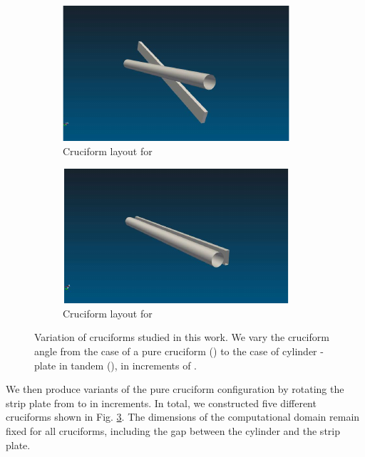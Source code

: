 \documentclass[oneside]{utmthesis}
\begin{document}
\begin{figure}
  \raggedright
  \begin{subfigure}[h]{0.3\textwidth}
    \includegraphics[width=\textwidth]{figs/cruciform225}
    \caption{Cruciform layout for \angtw{}}
    \label{fig:cruciform22.5}
  \end{subfigure}
  \hspace{6mm}
  \begin{subfigure}[h]{0.3\textwidth}
    \includegraphics[width=\textwidth]{figs/cruciform00}
    \caption{Cruciform layout for \angon{}}
    \label{fig:cruciform00}
  \end{subfigure}

  \caption{Variation of cruciforms studied in this work. We vary the cruciform angle from the case of a pure cruciform (\angfi{}) to the case of cylinder - plate in tandem (\angon{}), in increments of \angtw{}.}\label{fig:cruciformLayouts}
\end{figure}

We then produce variants of the pure cruciform configuration by rotating the strip plate from \angfi{} to \angon{} in \angtw{} increments. In total, we constructed five different cruciforms shown in Fig. \ref{fig:cruciformLayouts}. The dimensions of the computational domain remain fixed for all cruciforms, including the gap between the cylinder and the strip plate.
\end{document}
